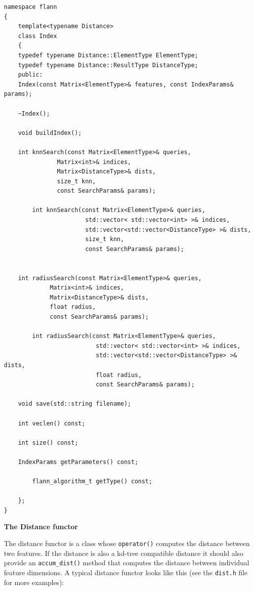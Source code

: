 \documentclass[letter,10pt]{article}
\begin{document}
\begin{Verbatim}[fontsize=\footnotesize,frame=single]
namespace flann
{
    template<typename Distance>
    class Index 
    {
	typedef typename Distance::ElementType ElementType;
	typedef typename Distance::ResultType DistanceType;
    public:
	Index(const Matrix<ElementType>& features, const IndexParams& params);

	~Index();

	void buildIndex();

	int knnSearch(const Matrix<ElementType>& queries, 
		       Matrix<int>& indices, 
		       Matrix<DistanceType>& dists, 
		       size_t knn, 
		       const SearchParams& params);

        int knnSearch(const Matrix<ElementType>& queries,
                       std::vector< std::vector<int> >& indices,
                       std::vector<std::vector<DistanceType> >& dists,
                       size_t knn,
                       const SearchParams& params);


	int radiusSearch(const Matrix<ElementType>& queries, 
			 Matrix<int>& indices, 
			 Matrix<DistanceType>& dists, 
			 float radius, 
			 const SearchParams& params);

        int radiusSearch(const Matrix<ElementType>& queries,
                          std::vector< std::vector<int> >& indices,
                          std::vector<std::vector<DistanceType> >& dists,
                          float radius,
                          const SearchParams& params);

	void save(std::string filename);

	int veclen() const;

	int size() const;

	IndexParams getParameters() const;

        flann_algorithm_t getType() const;

    };
}
\end{Verbatim}


\textbf{The Distance functor}

The distance functor is a class whose \texttt{operator()} computes the distance between two features. If the distance is
also a kd-tree compatible distance it should also provide an \texttt{accum\_dist()} method that computes the distance
between individual feature dimensions. A typical distance functor looks like this (see the \texttt{dist.h} file for more
examples):
\end{document}
